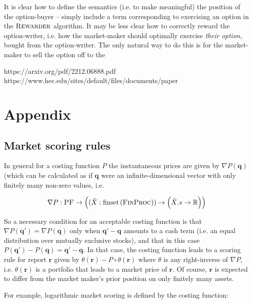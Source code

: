 \documentclass{article}
\begin{document}
It is clear how to define the semantics (i.e. to make meaningful) the position of the option-buyer -- simply include a term corresponding to exercising an option in the $\Rewarder$ algorithm. It may be less clear how to correctly reward the option-writer, i.e. how the market-maker should optimally exercise \emph{their option}, bought from the option-writer. The only natural way to do this is for the market-maker to sell the option off to the 

https://arxiv.org/pdf/2212.06888.pdf
https://www.hec.edu/sites/default/files/documents/paper%


\printbibliography

\appendix

\section*{Appendix}

\subsection*{Market scoring rules}

In general for a costing function $P$ the instantaneous prices are given by $\nabla P(\mathbf{q})$ (which can be calculated as if $\mathbf{q}$ were an infinite-dimensional vector with only finitely many non-zero values, i.e. 

\begin{equation*}
    \nabla P : \PF\to\left((\hat{X} : \finset{\FinProc})\to\left(\hat{X}.s\to\Reals\right)\right)
\end{equation*}

So a necessary condition for an acceptable costing function is that $\nabla P(\mathbf{q}')=\nabla P(\mathbf{q})$ only when $\mathbf{q}'-\mathbf{q}$ amounts to a cash term (i.e. an equal distribution over mutually exclusive stocks), and that in this case $P(\mathbf{q}')-P(\mathbf{q})=\mathbf{q}'-\mathbf{q}$. In that case, the costing function leads to a scoring rule for report $\mathbf{r}$ given by $\theta(\mathbf{r})-P\circ\theta(\mathbf{r})$ where $\theta$ is any right-inverse of $\nabla P$, i.e. $\theta(\mathbf{r})$ is a portfolio that leads to a market price of $\mathbf{r}$. Of course, $\mathbf{r}$ is expected to differ from the market maker's prior position on only finitely many assets.

For example, logarithmic market scoring \cite{hanson_logarithmic_2002} is defined by the costing function:
\end{document}
